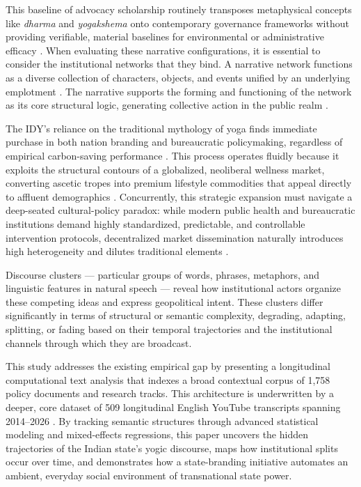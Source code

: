 \documentclass[11pt]{article}
\begin{document}
This baseline of advocacy scholarship routinely transposes metaphysical concepts like \textit{dharma} and \textit{yogakshema} onto contemporary governance frameworks without providing verifiable, material baselines for environmental or administrative efficacy \cite{sadineni2024reimagining}. When evaluating these narrative configurations, it is essential to consider the institutional networks that they bind. A narrative network functions as a diverse collection of characters, objects, and events unified by an underlying emplotment \cite{lejano2013}. The narrative supports the forming and functioning of the network as its core structural logic, generating collective action in the public realm \cite{lejano2013}.

The IDY's reliance on the traditional mythology of yoga finds immediate purchase in both nation branding and bureaucratic policymaking, regardless of empirical carbon-saving performance \cite{deneufville1987}. This process operates fluidly because it exploits the structural contours of a globalized, neoliberal wellness market, converting ascetic tropes into premium lifestyle commodities that appeal directly to affluent demographics \cite{sen2026yoga}. Concurrently, this strategic expansion must navigate a deep-seated cultural-policy paradox: while modern public health and bureaucratic institutions demand highly standardized, predictable, and controllable intervention protocols, decentralized market dissemination naturally introduces high heterogeneity and dilutes traditional elements \cite{zhou2026yoga}.

Discourse clusters — particular groups of words, phrases, metaphors, and linguistic features in natural speech — reveal how institutional actors organize these competing ideas and express geopolitical intent. These clusters differ significantly in terms of structural or semantic complexity, degrading, adapting, splitting, or fading based on their temporal trajectories and the institutional channels through which they are broadcast.

This study addresses the existing empirical gap by presenting a longitudinal computational text analysis that indexes a broad contextual corpus of 1,758 policy documents and research tracks. This architecture is underwritten by a deeper, core dataset of 509 longitudinal English YouTube transcripts spanning 2014--2026 \cite{bonikowski2022}. By tracking semantic structures through advanced statistical modeling and mixed-effects regressions, this paper uncovers the hidden trajectories of the Indian state's yogic discourse, maps how institutional splits occur over time, and demonstrates how a state-branding initiative automates an ambient, everyday social environment of transnational state power.
\end{document}
